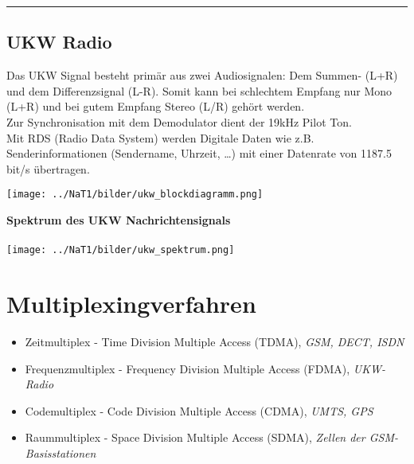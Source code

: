 \hrule
\subsection{UKW Radio}
Das UKW Signal besteht primär aus zwei Audiosignalen: Dem Summen- (L+R) und dem Differenzsignal (L-R).
Somit kann bei schlechtem Empfang nur Mono (L+R) und bei gutem Empfang Stereo (L/R) gehört werden. \\
Zur Synchronisation mit dem Demodulator dient der 19kHz Pilot Ton. \\
Mit RDS (Radio Data System) werden Digitale Daten wie z.B. Senderinformationen (Sendername, Uhrzeit,
\ldots) mit einer Datenrate von 1187.5 bit/s übertragen. \\
\begin{minipage}{9cm}
	\texttt{[image: ../NaT1/bilder/ukw\_blockdiagramm.png]}
\end{minipage}
\begin{minipage}{9cm} 
	\textbf{Spektrum des UKW Nachrichtensignals} \\ \\
    \texttt{[image: ../NaT1/bilder/ukw\_spektrum.png]}
\end{minipage}

 






 
 
 


\newpage
\section{Multiplexingverfahren} \label{multiplex}


\begin{itemize}
  \item Zeitmultiplex - Time Division Multiple Access (TDMA), \textit{GSM, DECT, ISDN}
  \item Frequenzmultiplex - Frequency Division Multiple Access (FDMA), \textit{UKW-Radio}
  \item Codemultiplex - Code Division Multiple Access (CDMA), \textit{UMTS, GPS}
  \item Raummultiplex - Space Division Multiple Access (SDMA), \textit{Zellen der GSM-Basisstationen}
\end{itemize}


